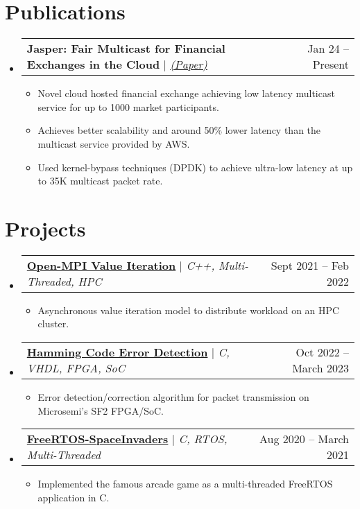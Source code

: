 \documentclass[letterpaper,11pt]{article}
\makeatletter
\newcommand{\resumeItem}[1]{
  \item\small{
    {#1 \vspace{-2pt}}
  }
}
\newcommand{\resumeProjectHeading}[2]{
    \item
    \begin{tabular*}{0.97\textwidth}{l@{\extracolsep{\fill}}r}
      \small#1 & #2 \\
    \end{tabular*}\vspace{-7pt}
}
\newcommand{\resumeSubHeadingListStart}{\begin{itemize}[leftmargin=0.15in, label={}]}
\newcommand{\resumeSubHeadingListEnd}{\end{itemize}}
\newcommand{\resumeItemListStart}{\begin{itemize}}
\newcommand{\resumeItemListEnd}{\end{itemize}\vspace{-5pt}}
\makeatother
\begin{document}
\section{Publications}
    \resumeSubHeadingListStart
        \resumeProjectHeading
          {\textbf{Jasper: Fair Multicast for Financial Exchanges in the Cloud} $|$ \emph{\href{https://dl.acm.org/doi/10.1145/3672202.3673728}{\underline{(Paper)}}}}{Jan 24 -- Present}
          \resumeItemListStart
                \resumeItem{Novel cloud hosted financial exchange achieving low latency multicast service for up to 1000 market participants.}
                \resumeItem{Achieves better scalability and around 50\% lower latency than the multicast service provided by AWS. }
                \resumeItem{Used kernel-bypass techniques (DPDK) to achieve ultra-low latency at up to 35K multicast packet rate.}
          \resumeItemListEnd
    \resumeSubHeadingListEnd

\vspace{-8.0pt}

\section{Projects}
    \resumeSubHeadingListStart
        \resumeProjectHeading
            {\href{https://github.com/duclos-cavalcanti/Open-MPI-ValueIteration}{\textbf{Open-MPI Value Iteration}} $|$ \emph{C++, Multi-Threaded, HPC}}{\small{Sept 2021 -- Feb 2022}}
            \resumeItemListStart
              \resumeItem{Asynchronous value iteration model to distribute workload on an HPC cluster.}
            \resumeItemListEnd
        \resumeProjectHeading
            {\href{https://github.com/duclos-cavalcanti/microsemi-error-detection}{\textbf{Hamming Code Error Detection}} $|$ \emph{C, VHDL, FPGA, SoC}}{\small{Oct 2022 -- March 2023}}
            \resumeItemListStart
              \resumeItem{Error detection/correction algorithm for packet transmission on Microsemi's SF2 FPGA/SoC.}
            \resumeItemListEnd
        \resumeProjectHeading
            {\href{https://github.com/duclos-cavalcanti/FreeRTOS-SpaceInvaders}{\textbf{FreeRTOS-SpaceInvaders}} $|$ \emph{C, RTOS, Multi-Threaded}}{\small{Aug 2020 -- March 2021}}
            \resumeItemListStart
              \resumeItem{Implemented the famous arcade game as a multi-threaded FreeRTOS application in C.}
            \resumeItemListEnd

    \resumeSubHeadingListEnd
    
\end{document}
